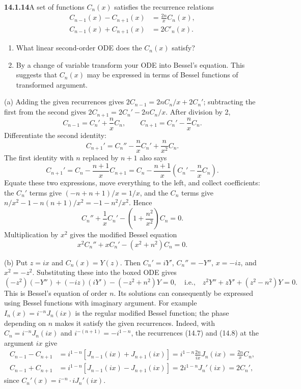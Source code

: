 \par\bigskip
\noindent\textbf{14.1.14}\quad A set of functions $C_{n}(x)$ satisfies the
recurrence relations
\begin{align*}
C_{n-1}(x)-C_{n+1}(x)&=\frac{2n}{x}C_{n}(x),\\
C_{n-1}(x)+C_{n+1}(x)&=2C'_{n}(x).
\end{align*}
\begin{enumerate}
\item[(a)] What linear second-order ODE does the $C_{n}(x)$ satisfy?
\item[(b)] By a change of variable transform your ODE into Bessel's
equation. This suggests that $C_{n}(x)$ may be expressed in terms of
Bessel functions of transformed argument.
\end{enumerate}
\solution
(a) Adding the given recurrences gives
$2C_{n-1}=2nC_n/x+2C_n'$; subtracting the first from the second gives
$2C_{n+1}=2C_n'-2nC_n/x$. After division by 2,
\[
C_{n-1}=C_n'+\frac n{x}C_n,\qquad
C_{n+1}=C_n'-\frac n{x}C_n.
\]
Differentiate the second identity:
\[
C_{n+1}'=C_n''-\frac n{x}C_n'+\frac n{x^2}C_n.
\]
The first identity with $n$ replaced by $n+1$ also says
\[
C_{n+1}'=C_n-\frac{n+1}{x}C_{n+1}
=C_n-\frac{n+1}{x}\left(C_n'-\frac n{x}C_n\right).
\]
Equate these two expressions, move everything to the left, and collect
coefficients: the $C_n'$ terms give $(-n+n+1)/x=1/x$, and the $C_n$
terms give $n/x^2-1-n(n+1)/x^2=-1-n^2/x^2$. Hence
\[
C_n''+\frac1xC_n'-\left(1+\frac{n^2}{x^2}\right)C_n=0.
\]
Multiplication by $x^2$ gives the modified Bessel equation
\[
\boxed{x^2C_n''+xC_n'-(x^2+n^2)C_n=0.}
\]

(b) Put $z=ix$ and $C_n(x)=Y(z)$. Then $C_n'=iY'$,
$C_n''=-Y''$, $x=-iz$, and $x^2=-z^2$. Substituting these into the
boxed ODE gives
\[
(-z^2)(-Y'')+(-iz)(iY')-(-z^2+n^2)Y=0,\quad\text{i.e.,}\quad
\boxed{z^2Y''+zY'+(z^2-n^2)Y=0}.
\]
This is Bessel's equation of order $n$. Its solutions can consequently
be expressed using Bessel functions with imaginary argument.
For example $I_n(x)=i^{-n}J_n(ix)$ is the regular modified Bessel
function; the phase depending on $n$ makes it satisfy the given
recurrences. Indeed, with $C_n=i^{-n}J_n(ix)$ and
$i^{-(n+1)}=-i^{1-n}$, the recurrences (14.7) and (14.8) at the
argument $ix$ give
\begin{align*}
C_{n-1}-C_{n+1}&=i^{1-n}[J_{n-1}(ix)+J_{n+1}(ix)]
=i^{1-n}\frac{2n}{ix}J_n(ix)=\frac{2n}{x}C_n,\\
C_{n-1}+C_{n+1}&=i^{1-n}[J_{n-1}(ix)-J_{n+1}(ix)]
=2i^{1-n}J_n'(ix)=2C_n',
\end{align*}
since $C_n'(x)=i^{-n}\cdot iJ_n'(ix)$.

